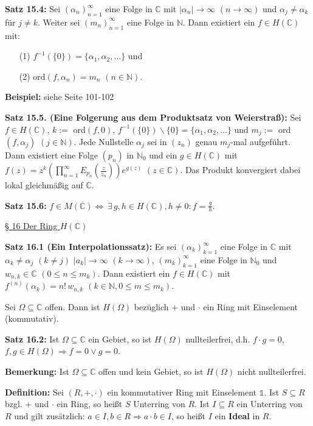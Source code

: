 \documentclass[11pt]{article}
\newcommand{\C}{\mathbb{C}}
\newcommand{\N}{\mathbb{N}}
\begin{document}
\textbf{Satz 15.4:} Sei $(\alpha_n)_{n=1}^\infty$ eine Folge in $\C$ mit $|\alpha_n| \to \infty$ $(n \to \infty)$ und $\alpha_j \neq \alpha_k$ für $j \neq k$. Weiter sei $(m_n)_{n = 1}^\infty$ eine Folge in $\N$. Dann existiert ein $f \in H(\C)$ mit:
\vspace{-0.6cm}
\begin{itemize}
\item[(1)] $f^{-1}(\{ 0 \}) = \{ \alpha_1, \alpha_2, \dots \}$ und \vspace{-0.2cm}
\item[(2)] ord$(f,\alpha_n) = m_n$ $(n \in \N)$.
\end{itemize}
\vspace{-0.3cm}

\textbf{Beispiel:} siehe Seite 101-102

\newpage
\textbf{Satz 15.5. (Eine Folgerung aus dem Produktsatz von Weierstraß):} Sei $f \in H(\C)$, $k :=$ ord$(f,0)$, $f^{-1}(\{ 0 \})\backslash \{ 0 \} = \{ \alpha_1, \alpha_2, \dots \}$ und $m_j := $ ord$(f, \alpha_j)$ $(j \in \N)$. Jede Nullstelle $\alpha_j$ sei in $(z_n)$ genau $m_j$-mal aufgeführt. Dann existiert eine Folge $(p_n)$ in $\N_0$ und ein $g \in H(\C)$ mit $f(z) = z^k \left( \prod_{n=1}^\infty E_{p_n} (\frac{z}{z_n}) \right) e^{g(z)}$ $(z \in \C)$. Das Produkt konvergiert dabei lokal gleichmäßig auf $\C$.

\textbf{Satz 15.6:} $f \in M(\C) \Leftrightarrow \, \exists \, g,h \in H(\C), h \neq 0 \colon f = \frac{g}{h}$.

\underline{§ 16 Der Ring $H(\C)$}

\textbf{Satz 16.1 (Ein Interpolationssatz):} Es sei $(\alpha_k)_{k = 1}^\infty$ eine Folge in $\C$ mit $\alpha_k \neq \alpha_j$ $(k \neq j)$ $|a_k| \to \infty$ $(k \to \infty)$, $(m_k)_{k=1}^\infty$ eine Folge in $\N_0$ und $w_{n,k} \in \C$ $(0 \leq n \leq m_k)$. Dann existiert ein $f \in H(\C)$ mit $f^{(n)}(\alpha_k) = n! \, w_{n,k}$ $(k \in \N, 0 \leq m \leq m_k)$.

Sei $\Omega \subseteq \C$ offen. Dann ist $H(\Omega)$ bezüglich $+$ und $\cdot$ ein Ring mit Einselement (kommutativ).

\textbf{Satz 16.2:} Ist $\Omega \subseteq \C$ ein Gebiet, so ist $H(\Omega)$ nullteilerfrei, d.h. $f \cdot g = 0$, $f,g \in H(\Omega) \Rightarrow f=0 \vee g = 0$.

\textbf{Bemerkung:} Ist $\Omega \subseteq \C$ offen und kein Gebiet, so ist $H(\Omega)$ nicht nullteilerfrei.

\textbf{Definition:} Sei $(R,+,\cdot)$ ein kommutativer Ring mit Einselement $\mathbb{1}$. Ist $S \subseteq R$ bzgl. $+$ und $\cdot$ ein Ring, so heißt $S$ Unterring von $R$. Ist $I \subseteq R$ ein Unterring von $R$ und gilt zusätzlich: $a \in I, b \in R \Rightarrow a \cdot b \in I$, so heißt $I$ ein \textbf{Ideal} in $R$.
\end{document}
